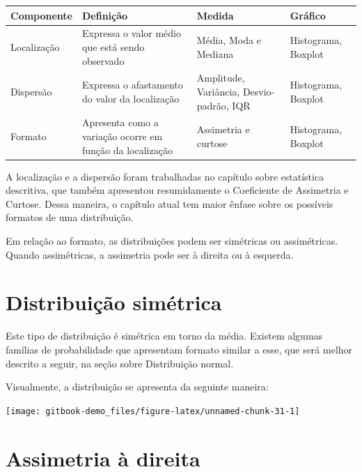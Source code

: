 \documentclass[
]{book}
\begin{document}
\begin{longtable}[]{@{}
  >{\raggedright\arraybackslash}p{}
  >{\raggedright\arraybackslash}p{}
  >{\raggedright\arraybackslash}p{}
  >{\raggedright\arraybackslash}p{}@{}}
\toprule
Componente & Definição & Medida & Gráfico \\
\midrule
\endhead
Localização & Expressa o valor médio que está sendo observado & Média, Moda e Mediana & Histograma, Boxplot \\
Dispersão & Expressa o afastamento do valor da localização & Amplitude, Variância, Desvio-padrão, IQR & Histograma, Boxplot \\
Formato & Apresenta como a variação ocorre em função da localização & Assimetria e curtose & Histograma, Boxplot \\
\bottomrule
\end{longtable}

A localização e a dispersão foram trabalhadas no capítulo sobre estatística descritiva, que também apresentou resumidamente o Coeficiente de Assimetria e Curtose. Dessa maneira, o capítulo atual tem maior ênfase sobre os possíveis formatos de uma distribuição.

Em relação ao formato, as distribuições podem ser simétricas ou assimétricas. Quando assimétricas, a assimetria pode ser à direita ou à esquerda.

\hypertarget{distribuiuxe7uxe3o-simuxe9trica}{%
\section{Distribuição simétrica}\label{distribuiuxe7uxe3o-simuxe9trica}}

Este tipo de distribuição é simétrica em torno da média. Existem algumas famílias de probabilidade que apresentam formato similar a esse, que será melhor descrito a seguir, na seção sobre Distribuição normal.

Visualmente, a distribuição se apresenta da seguinte maneira:

\begin{center}\texttt{[image: gitbook-demo\_files/figure-latex/unnamed-chunk-31-1]} \end{center}

\hypertarget{assimetria-uxe0-direita}{%
\section{Assimetria à direita}\label{assimetria-uxe0-direita}}
\end{document}
